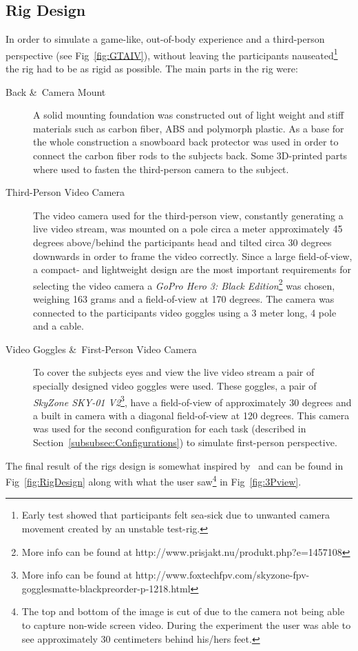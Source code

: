 \documentclass[runningheads,a4paper,oribibl]{llncs}
\begin{document}
\subsection{Rig Design}
In order to simulate a game-like, out-of-body experience and a third-person perspective (see Fig~\ref{fig:GTAIV}), without leaving the participants nauseated\footnote{Early test showed that participants felt sea-sick due to unwanted camera movement created by an unstable test-rig.} the rig had to be as rigid as possible. The main parts in the rig were:
\begin{description}
	\item[Back \&\ Camera Mount] A solid mounting foundation was constructed out of light weight and stiff materials such as carbon fiber, ABS and polymorph plastic. As a base for the whole construction a snowboard back protector was used in order to connect the carbon fiber rods to the subjects back. Some 3D-printed parts where used to fasten the third-person camera to the subject.

	\item[Third-Person Video Camera] The video camera used for the third-person view, constantly generating a live video stream, was mounted on a pole circa a meter approximately 45 degrees above/behind the participants head and tilted circa 30 degrees downwards in order to frame the video correctly. Since a large field-of-view, a compact- and lightweight design are the most important requirements for selecting the video camera a \emph{GoPro Hero 3: Black Edition}\footnote{More info can be found at http://www.prisjakt.nu/produkt.php?e=1457108} was chosen, weighing 163 grams and a field-of-view at 170 degrees. The camera was connected to the participants video goggles using a 3 meter long, 4 pole and a cable.

	\item[Video Goggles \&\ First-Person Video Camera] To cover the subjects eyes and view the live video stream a pair of specially designed video goggles were used. These goggles, a pair of \emph{SkyZone SKY-01 V2}\footnote{More info can be found at http://www.foxtechfpv.com/skyzone-fpv-gogglesmatte-blackpreorder-p-1218.html}, have a field-of-view of approximately 30 degrees and a built in camera with a diagonal field-of-view at 120 degrees. This camera was used for the second configuration for each task (described in Section~\ref{subsubsec:Configurations}) to simulate first-person perspective.
\end{description}
The final result of the rigs design is somewhat inspired by~\cite{salamin2010quantifying} and can be found in Fig~\ref{fig:RigDesign} along with what the user saw\footnote{The top and bottom of the image is cut of due to the camera not being able to capture non-wide screen video. During the experiment the user was able to see approximately 30 centimeters behind his/hers feet.} in Fig~\ref{fig:3Pview}.
\end{document}
